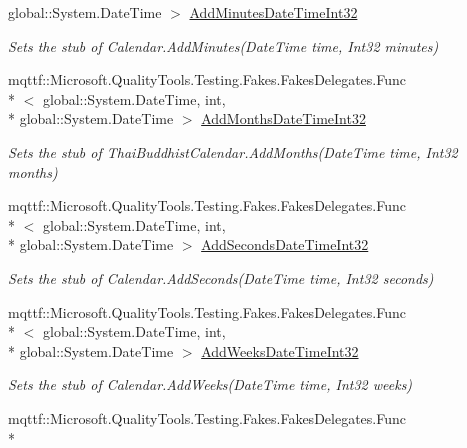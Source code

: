 \begin{DoxyCompactItemize}
global\-::\-System.\-Date\-Time $>$ \hyperlink{class_system_1_1_globalization_1_1_fakes_1_1_stub_thai_buddhist_calendar_aa240831fea42e1d9b2701504898e7b9d}{Add\-Minutes\-Date\-Time\-Int32}
\begin{DoxyCompactList}\small\item\em Sets the stub of Calendar.\-Add\-Minutes(\-Date\-Time time, Int32 minutes)\end{DoxyCompactList}\item 
mqttf\-::\-Microsoft.\-Quality\-Tools.\-Testing.\-Fakes.\-Fakes\-Delegates.\-Func\\*
$<$ global\-::\-System.\-Date\-Time, int, \\*
global\-::\-System.\-Date\-Time $>$ \hyperlink{class_system_1_1_globalization_1_1_fakes_1_1_stub_thai_buddhist_calendar_a8c4b4c6bb7b1501eb672c08f1a84d477}{Add\-Months\-Date\-Time\-Int32}
\begin{DoxyCompactList}\small\item\em Sets the stub of Thai\-Buddhist\-Calendar.\-Add\-Months(\-Date\-Time time, Int32 months)\end{DoxyCompactList}\item 
mqttf\-::\-Microsoft.\-Quality\-Tools.\-Testing.\-Fakes.\-Fakes\-Delegates.\-Func\\*
$<$ global\-::\-System.\-Date\-Time, int, \\*
global\-::\-System.\-Date\-Time $>$ \hyperlink{class_system_1_1_globalization_1_1_fakes_1_1_stub_thai_buddhist_calendar_a84d78e14b52cd10cc37748db8dc54eb6}{Add\-Seconds\-Date\-Time\-Int32}
\begin{DoxyCompactList}\small\item\em Sets the stub of Calendar.\-Add\-Seconds(\-Date\-Time time, Int32 seconds)\end{DoxyCompactList}\item 
mqttf\-::\-Microsoft.\-Quality\-Tools.\-Testing.\-Fakes.\-Fakes\-Delegates.\-Func\\*
$<$ global\-::\-System.\-Date\-Time, int, \\*
global\-::\-System.\-Date\-Time $>$ \hyperlink{class_system_1_1_globalization_1_1_fakes_1_1_stub_thai_buddhist_calendar_a3344accc9895464fc7323fd2debfabd7}{Add\-Weeks\-Date\-Time\-Int32}
\begin{DoxyCompactList}\small\item\em Sets the stub of Calendar.\-Add\-Weeks(\-Date\-Time time, Int32 weeks)\end{DoxyCompactList}\item 
mqttf\-::\-Microsoft.\-Quality\-Tools.\-Testing.\-Fakes.\-Fakes\-Delegates.\-Func\\*

\end{DoxyCompactItemize}
